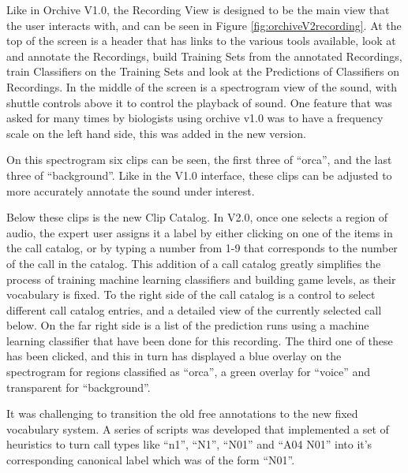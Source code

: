 \documentclass[12pt,oneside]{book}
\begin{document}
Like in Orchive V1.0, the Recording View is designed to be the main
view that the user interacts with, and can be seen in Figure
\ref{fig:orchiveV2recording}.  At the top of the screen is a header
that has links to the various tools available, look at and annotate
the Recordings, build Training Sets from the annotated Recordings,
train Classifiers on the Training Sets and look at the Predictions of
Classifiers on Recordings.  In the middle of the screen is a
spectrogram view of the sound, with shuttle controls above it to
control the playback of sound.  One feature that was asked for many
times by biologists using orchive v1.0 was to have a frequency scale on
the left hand side, this was added in the new version.

On this spectrogram six clips can be seen, the first three of
``orca'', and the last three of ``background''.  Like in the V1.0
interface, these clips can be adjusted to more accurately annotate the
sound under interest.

Below these clips is the new Clip Catalog.  In V2.0, once one selects
a region of audio, the expert user assigns it a label by either
clicking on one of the items in the call catalog, or by typing a
number from 1-9 that corresponds to the number of the call in the
catalog.  This addition of a call catalog greatly simplifies the
process of training machine learning classifiers and building game
levels, as their vocabulary is fixed.  To the right side of the call
catalog is a control to select different call catalog entries, and a
detailed view of the currently selected call below.  On the far right
side is a list of the prediction runs using a machine learning
classifier that have been done for this recording.  The third one of
these has been clicked, and this in turn has displayed a blue overlay
on the spectrogram for regions classified as ``orca'', a green overlay
for ``voice'' and transparent for ``background''.

It was challenging to transition the old free annotations to the new
fixed vocabulary system.  A series of scripts was developed that
implemented a set of heuristics to turn call types like ``n1'', ``N1'',
``N01'' and ``A04 N01'' into it's corresponding canonical label which
was of the form ``N01''.
\end{document}
